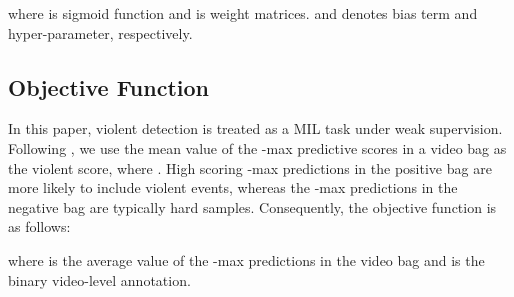 \documentclass[sigconf]{acmart}
\begin{document}
where  is sigmoid function and  is weight matrices.  and  denotes bias term and hyper-parameter, respectively.


\subsection{Objective Function}
In this paper, violent detection is treated as a MIL task under weak supervision. Following \cite{c:2,c:7}, we use the mean value of the -max predictive scores in a video bag as the violent score, where . High scoring -max predictions in the positive bag are more likely to include violent events, whereas the -max predictions in the negative bag are typically hard samples. Consequently, the objective function is as follows:

where  is the average value of the -max predictions in the video bag and  is the binary video-level annotation.
\end{document}
